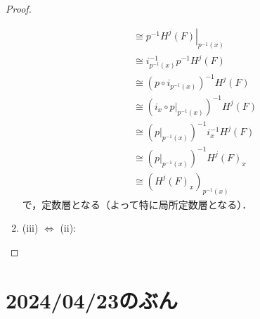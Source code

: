 \begin{proof}
\begin{enumerate}
\begin{align*}
            &\cong
            p^{-1}\left. H^j\left(F\right)\right\rvert_{p^{-1}(x)}\\
            &\cong
            i^{-1}_{p^{-1}(x)}p^{-1}H^j\left(F\right)\\
            &\cong
            \left(p\circ i_{p^{-1}(x)}\right)^{-1}H^j\left(F\right)\\
            &\cong
            \left(i_{x}\circ p\rvert_{p^{-1}(x)}\right)^{-1}H^j\left(F\right)\\
            &\cong
            \left(p\rvert_{p^{-1}(x)}\right)^{-1}i_{x}^{-1}H^j\left(F\right)\\
            &\cong
            \left(p\rvert_{p^{-1}(x)}\right)^{-1}H^j\left(F\right)_{x}\\
            &\cong
            \left(H^j\left(F\right)_{x}\right)_{p^{-1}(x)}
        \end{align*}
        で，定数層となる（よって特に局所定数層となる）．
        \item\label{372-32} (iii) \(\Leftrightarrow\) (ii):      
    \end{enumerate}
\end{proof}


\clearpage

\section{2024/04/23のぶん}

